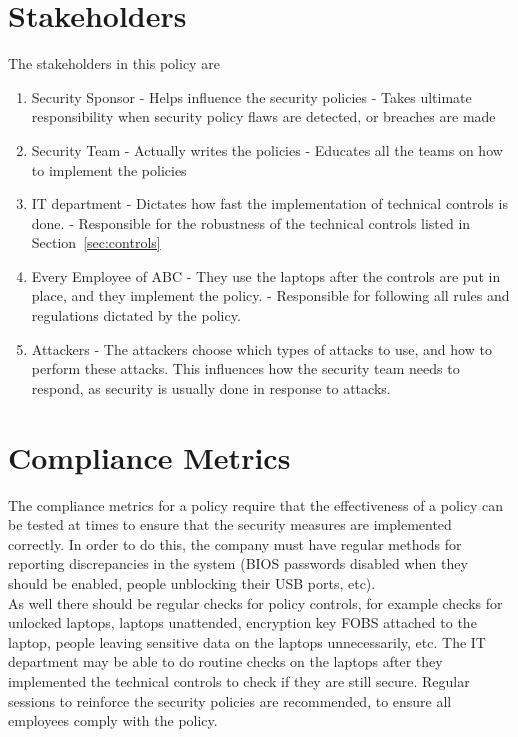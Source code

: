 \documentclass{article}
\numberwithin{equation}{section} %
\numberwithin{figure}{section} %
\numberwithin{table}{section} %
\begin{document}
\section{Stakeholders}
\label{sec:stakeholders}
The stakeholders in this policy are 
\begin{enumerate}
	\item Security Sponsor
		\subitem - Helps influence the security policies
		\subitem - Takes ultimate responsibility when security policy flaws are detected, or breaches are made
	\item Security Team
		\subitem - Actually writes the policies
		\subitem - Educates all the teams on how to implement the policies
	\item IT department
		\subitem - Dictates how fast the implementation of technical controls is done.
		\subitem - Responsible for the robustness of the technical controls listed in Section~\ref{sec:controls}
	\item Every Employee of ABC
		\subitem - They use the laptops after the controls are put in place, and they implement the policy. 
		\subitem - Responsible for following all rules and regulations dictated by the policy.
	\item Attackers
		\subitem - The attackers choose which types of attacks to use, and how to perform these attacks.  This influences how the security team needs to respond, as security is usually done in response to attacks.  
\end{enumerate}
\section{Compliance Metrics}
The compliance metrics for a policy require that the effectiveness of a policy can be tested at times to ensure that the security measures are implemented correctly.  In order to do this, the company must have regular methods for reporting discrepancies in the system (BIOS passwords disabled when they should be enabled, people unblocking their USB ports, etc).\\

As well there should be regular checks for policy controls, for example checks for unlocked laptops, laptops unattended, encryption key FOBS attached to the laptop, people leaving sensitive data on the laptops unnecessarily, etc. The IT department may be able to do routine checks on the laptops after they implemented the technical controls to check if they are still secure.  Regular sessions to reinforce the security policies are recommended, to ensure all employees comply with the policy.
\end{document}
